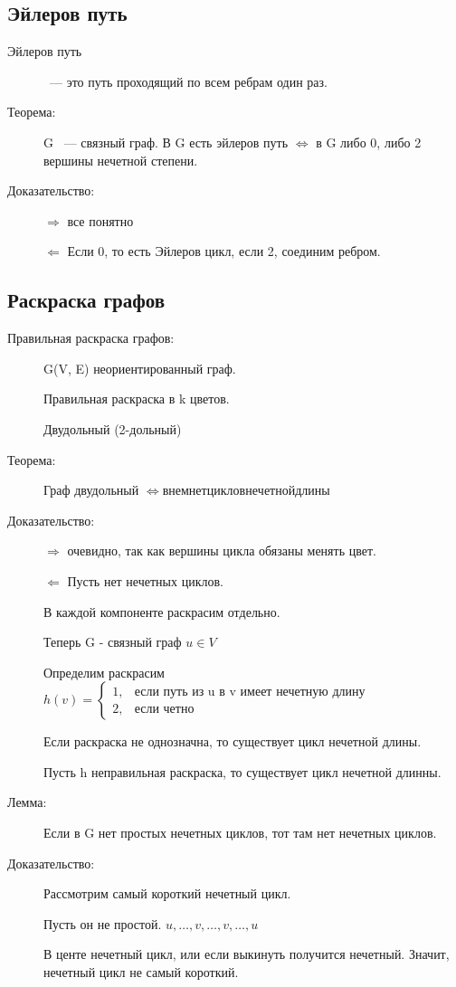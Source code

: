 \documentclass[12pt]{article}
\begin{document}
\subsection{Эйлеров путь}
\begin{description}

\item [Эйлеров путь] ~--- это путь проходящий по всем ребрам один раз. 

\item [Теорема:] G ~--- связный граф. В G есть эйлеров путь $\Leftrightarrow$ в G либо 0, либо 2 вершины нечетной степени. 

\item [Доказательство:] $\Rightarrow$ все понятно

$\Leftarrow$ Если 0, то есть Эйлеров цикл, если 2, соединим ребром. 
\end{description}

\subsection{Раскраска графов}


\begin{description}
\item[Правильная раскраска графов:] G(V, E) неориентированный граф. 

Правильная раскраска в k цветов.

Двудольный (2-дольный)
\item[Теорема:] Граф двудольный $\Leftrightarrow в нем нет циклов нечетной длины$

\item[Доказательство:] $\Rightarrow$ очевидно, так как вершины цикла обязаны менять цвет. 

$\Leftarrow$ Пусть нет нечетных циклов. 

В каждой компоненте раскрасим отдельно. 

Теперь G - связный граф $u \in V$ 

Определим раскрасим $h(v) = \begin{cases} 1, & \text{если путь из u в v имеет нечетную длину}\\
2, &\text{если четно}\end{cases}$

Если раскраска не однозначна, то существует цикл нечетной длины.

Пусть h неправильная раскраска, то существует цикл нечетной длинны. 

\item[Лемма:] Если в G нет простых нечетных циклов, тот там нет нечетных циклов. 

\item[Доказательство:] Рассмотрим самый короткий нечетный цикл. 

Пусть он не простой. $u, \ldots, v, \ldots, v, \ldots, u$

В центе нечетный цикл, или если выкинуть получится нечетный. Значит, нечетный цикл не самый короткий. 
\end{description}
\end{document}
